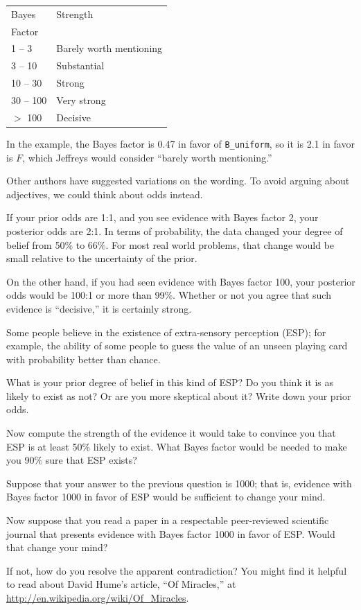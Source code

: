 \documentclass[12pt]{book}
\begin{document}
\begin{tabular}{|l|l|}
\hline
Bayes & Strength \\
Factor & \\
\hline
1 -- 3 & Barely worth mentioning \\
3 -- 10 & Substantial \\
10 -- 30 & Strong \\
30 -- 100 & Very strong \\
$>$ 100 & Decisive \\
\hline
\end{tabular}

In the example, the Bayes factor is 0.47 in favor of \verb"B_uniform",
so it is 2.1 in favor is $F$, which Jeffreys would consider
``barely worth mentioning.''

Other authors have suggested variations on the wording.  To
avoid arguing about adjectives, we could think about odds instead.

If your prior odds are 1:1, and you see evidence with Bayes
factor 2, your posterior odds are 2:1.  In terms of probability,
the data changed your degree of belief from 50\% to 66\%.  For
most real world problems, that change would be small relative
to the uncertainty of the prior.

On the other hand, if you had seen evidence with Bayes
factor 100, your posterior odds would be 100:1 or more than 99\%.
Whether or not you agree that such evidence is ``decisive,''
it is certainly strong.

\begin{exercise}
Some people believe in the existence of extra-sensory
perception (ESP); for example, the ability of some people to guess
the value of an unseen playing card with probability better
than chance.

What is your prior degree of belief in this kind of ESP?
Do you think it is as likely to exist as not?  Or are you
more skeptical about it?  Write down your prior odds.

Now compute the strength of the evidence it would take to
convince you that ESP is at least 50\% likely to exist.
What Bayes factor would be needed to make you 90\% sure
that ESP exists?
\end{exercise}


\begin{exercise}
Suppose that your answer to the previous question is 1000;
that is, evidence with Bayes factor 1000 in favor of ESP would
be sufficient to change your mind.

Now suppose that you read a paper in a respectable peer-reviewed
scientific journal that presents evidence with Bayes factor 1000 in
favor of ESP.  Would that change your mind?

If not, how do you resolve the apparent contradiction?
You might find it helpful to read about David Hume's article, ``Of
Miracles,'' at \url{http://en.wikipedia.org/wiki/Of_Miracles}.
\end{exercise}
\end{document}
